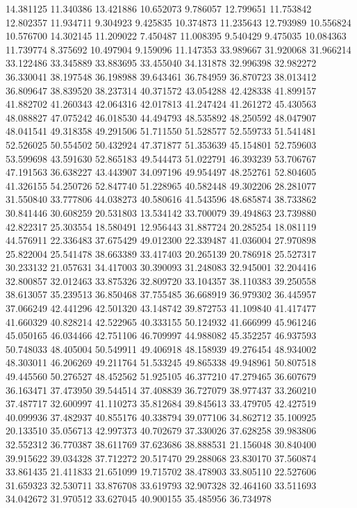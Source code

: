 14.381125
11.340386
13.421886
10.652073
9.786057
12.799651
11.753842
12.802357
11.934711
9.304923
9.425835
10.374873
11.235643
12.793989
10.556824
10.576700
14.302145
11.209022
7.450487
11.008395
9.540429
9.475035
10.084363
11.739774
8.375692
10.497904
9.159096
11.147353
33.989667
31.920068
31.966214
33.122486
33.345889
33.883695
33.455040
34.131878
32.996398
32.982272
36.330041
38.197548
36.198988
39.643461
36.784959
36.870723
38.013412
36.809647
38.839520
38.237314
40.371572
43.054288
42.428338
41.899157
41.882702
41.260343
42.064316
42.017813
41.247424
41.261272
45.430563
48.088827
47.075242
46.018530
44.494793
48.535892
48.250592
48.047907
48.041541
49.318358
49.291506
51.711550
51.528577
52.559733
51.541481
52.526025
50.554502
50.432924
47.371877
51.353639
45.154801
52.759603
53.599698
43.591630
52.865183
49.544473
51.022791
46.393239
53.706767
47.191563
36.638227
43.443907
34.097196
49.954497
48.252761
52.804605
41.326155
54.250726
52.847740
51.228965
40.582448
49.302206
28.281077
31.550840
33.777806
44.038273
40.580616
41.543596
48.685874
38.733862
30.841446
30.608259
20.531803
13.534142
33.700079
39.494863
23.739880
42.822317
25.303554
18.580491
12.956443
31.887724
20.285254
18.081119
44.576911
22.336483
37.675429
49.012300
22.339487
41.036004
27.970898
25.822004
25.541478
38.663389
33.417403
20.265139
20.786918
25.527317
30.233132
21.057631
34.417003
30.390093
31.248083
32.945001
32.204416
32.800857
32.012463
33.875326
32.809720
33.104357
38.110383
39.250558
38.613057
35.239513
36.850468
37.755485
36.668919
36.979302
36.445957
37.066249
42.441296
42.501320
43.148742
39.872753
41.109840
41.417477
41.660329
40.828214
42.522965
40.333155
50.124932
41.666999
45.961246
45.050165
46.034466
42.751106
46.709997
44.988082
45.352257
46.937593
50.748033
48.405004
50.549911
49.406918
48.158939
49.276454
48.934002
48.303011
46.206269
49.211764
51.533245
49.865338
49.948961
50.807518
49.445560
50.276527
48.452562
51.925105
46.377210
47.279465
36.607679
36.163471
37.473950
39.544514
37.408839
36.727079
38.977437
33.260210
37.487717
32.600997
41.110273
35.812684
39.845613
33.479705
42.427519
40.099936
37.482937
40.855176
40.338794
39.077106
34.862712
35.100925
20.133510
35.056713
42.997373
40.702679
37.330026
37.628258
39.983806
32.552312
36.770387
38.611769
37.623686
38.888531
21.156048
30.840400
39.915622
39.034328
37.712272
20.517470
29.288068
23.830170
37.560874
33.861435
21.411833
21.651099
19.715702
38.478903
33.805110
22.527606
31.659323
32.530711
33.876708
33.619793
32.907328
32.464160
33.511693
34.042672
31.970512
33.627045
40.900155
35.485956
36.734978
